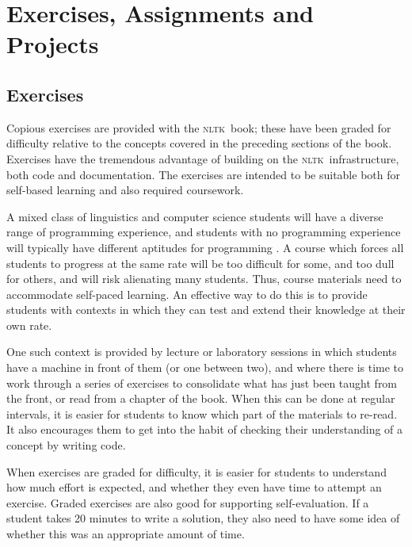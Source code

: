 \documentclass[11pt]{article}
\newcommand{\NLTK}{\textsc{nltk}}
\begin{document}
\section{Exercises, Assignments and Projects}
\label{sec:projects}

\subsection{Exercises}

Copious exercises are provided with the \NLTK\ book; these
have been graded for difficulty relative to the concepts covered in the
preceding sections of the book.  Exercises have the tremendous advantage of
building on the \NLTK\ infrastructure, both code and
documentation. The exercises are intended to be suitable both for
self-based learning and also required coursework.

A mixed class of linguistics and computer science students will have a
diverse range of programming experience, and students with no
programming experience will typically have different aptitudes for
programming \cite{Caspersen07}.  A course which forces all students to
progress at the same rate will be too difficult for some, and too dull
for others, and will risk alienating many students.  Thus, course
materials need to accommodate self-paced learning.  An effective way
to do this is to provide students with contexts in which they can test
and extend their knowledge at their own rate.

One such context is provided by lecture or laboratory sessions in
which students have a machine in front of them (or one between two),
and where there is time to work through a series of exercises to
consolidate what has just been taught from the front, or read from a
chapter of the book. When this can be done at regular intervals, it is easier for
students to know which part of the materials to re-read.  It also
encourages them to get into the habit of checking their understanding of a concept by writing
code.

When exercises are graded for difficulty, it is easier for students to
understand how much effort is expected, and whether they even have
time to attempt an exercise.  Graded exercises are also good for
supporting self-evaluation.  If a student takes 20 minutes to write a
solution, they also need to have some idea of whether this was an
appropriate amount of time.

\end{document}
